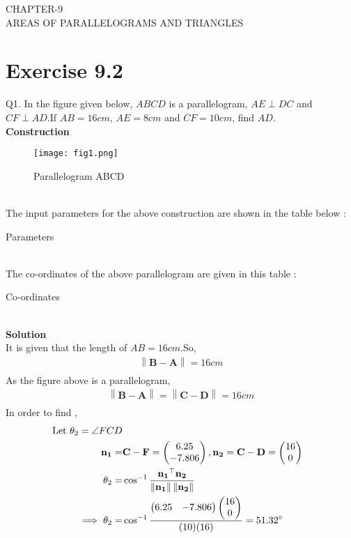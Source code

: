 \documentclass{article}
\providecommand{\norm}[1]{\left\lVert#1\right\rVert}
\newcommand{\myvec}[1]{\ensuremath{\begin{pmatrix}#1\end{pmatrix}}}
\let\vec\mathbf
\begin{document}
\begin{center}
        \textbf\large{CHAPTER-9 \\ AREAS OF PARALLELOGRAMS AND TRIANGLES}
\end{center}
\section{Exercise 9.2}
Q1. In the figure given below, $ABCD$ is a parallelogram, $AE \perp DC$ and $CF \perp AD$.If $AB = 16cm$, $AE = 8cm$ and $CF = 10cm$, find $AD$.\\
\textbf{Construction}\\
\begin{figure}[h]
 \begin{center}
  \texttt{[image: fig1.png]}
 \end{center}
 \caption{Parallelogram ABCD}
 \label{fig:Fig}
\end{figure}\\
\pagebreak
The input parameters for the above construction are shown in the table below : \\
\begin{table}[h]
	\centering
	
	\caption{Parameters}
	\label{tab:table1}
\end{table}\\
The co-ordinates of the above parallelogram are given in this table : \\
\begin{table}[h]
	\centering
	
	\caption{Co-ordinates}
	\label{tab:table2}
\end{table}\\
\textbf{Solution}\\
It is given that the length of $AB = 16cm$.So,\\
\begin{align}
	\norm{\vec{B} - \vec{A}} = 16cm \\
\end{align}
As the figure above is a parallelogram,\\
\begin{align}
	\norm{\vec{B} - \vec{A}} = \norm{\vec{C} - \vec{D}} = 16cm
	\label{eq:1}\\
\end{align}
\vspace{5mm}
In order to find ,\\
\begin{align}
	\text{ Let }\theta_2 = \angle{FCD}\\
\vec{n_1} = &\vec{C} - \vec{F} = \myvec{6.25\\-7.806}, \vec{n_2} = \vec{C} - \vec{D} = \myvec{16\\0} \\
\theta_2 = &\cos^{-1}\frac{\vec{n_1}^\top\vec{n_2}}{\norm{\vec{n_1}}\norm{\vec{n_2}}} \\
	\implies\theta_2 = &\cos^{-1}\frac{\myvec{6.25&-7.806}\myvec{16\\0}}{(10)(16)} = 51.32\degree
\end{align}
\end{document}
